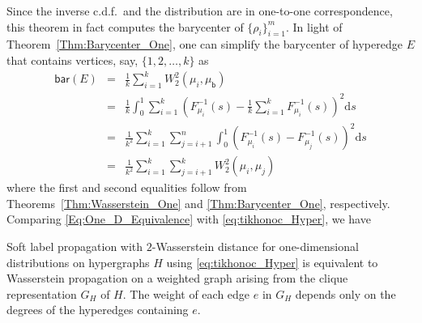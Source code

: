 \documentclass[letterpaper]{article} %
\begin{document}
Since the inverse c.d.f.\ and the distribution are in one-to-one correspondence, this theorem in fact computes the barycenter of $\{\rho_i\}_{i=1}^m$. In light of Theorem~\ref{Thm:Barycenter_One}, one can simplify the barycenter of hyperedge $E$ that contains vertices, say, $\{1, 2, \dots, k\}$ as 
\begin{eqnarray}
\mathsf{bar}(E) &=& \frac{1}{k}\sum_{i=1}^kW^2_2(\mu_i, \mu_\mathsf{b})\nonumber\\
&=&\frac{1}{k}\int_{0}^{1}\sum_{i=1}^k\left(F_{\mu_i}^{-1}(s)-\frac{1}{k}\sum_{i=1}^kF_{\mu_i}^{-1}(s)\right)^2\text{d}s\nonumber\\
&=&\frac{1}{k^2}\sum_{i=1}^k\sum_{j=i+1}^n\int_0^1\left(F_{\mu_i}^{-1}(s)-F_{\mu_j}^{-1}(s)\right)^2 \text{d}s \nonumber\\
&=&\frac{1}{k^2}\sum_{i=1}^k\sum_{j=i+1}^kW_2^2(\mu_i, \mu_j)\label{Eq:One_D_Equivalence}
\end{eqnarray}
where the first and second equalities follow from Theorems~\ref{Thm:Wasserstein_One} and \ref{Thm:Barycenter_One}, respectively. Comparing \eqref{Eq:One_D_Equivalence} with \eqref{eq:tikhonoc_Hyper}, we have
\begin{proposition}
  \label{prop:clique-equivalence}
  Soft label propagation with $2$-Wasserstein distance for one-dimensional distributions on hypergraphs $H$ using \eqref{eq:tikhonoc_Hyper} is equivalent to Wasserstein propagation on a weighted graph arising from the clique representation $G_H$ of $H$. The weight of each edge $e$ in $G_H$ depends only on the degrees of the hyperedges containing $e$.
\end{proposition}

\end{document}
